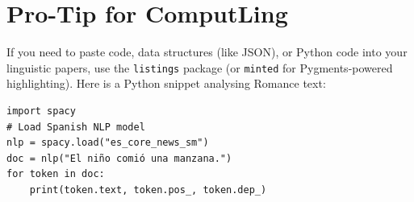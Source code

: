 \documentclass[11pt,a4paper]{article}
\begin{document}
\section{Pro-Tip for ComputLing}
If you need to paste code, data structures (like JSON), or Python code into your linguistic papers, use the \texttt{listings} package (or \texttt{minted} for Pygments-powered highlighting). Here is a Python snippet analysing Romance text:

\begin{verbatim}
import spacy
# Load Spanish NLP model
nlp = spacy.load("es_core_news_sm")
doc = nlp("El niño comió una manzana.")
for token in doc:
    print(token.text, token.pos_, token.dep_)
\end{verbatim}
\end{document}
